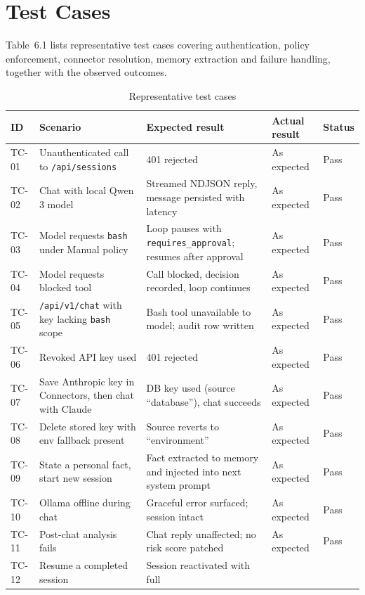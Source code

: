 \documentclass[12pt,a4paper,oneside]{report}
\begin{document}
\section{Test Cases}
Table~6.1 lists representative test cases covering authentication,
policy enforcement, connector resolution, memory extraction and
failure handling, together with the observed outcomes.
\begin{table}[!t]
\caption{Representative test cases}
\centering
\begin{singlespace}
\footnotesize
\setlength{\tabcolsep}{4pt}
\begin{tabular}{p{1.1cm}p{4.1cm}p{4.0cm}p{2.5cm}p{1.2cm}}
\toprule
\textbf{ID} & \textbf{Scenario} & \textbf{Expected result} &
\textbf{Actual result} & \textbf{Status} \\
\midrule
TC-01 & Unauthenticated call to \texttt{/api/sessions} & 401 rejected
& As expected & Pass \\
TC-02 & Chat with local Qwen 3 model & Streamed NDJSON reply, message
persisted with latency & As expected & Pass \\
TC-03 & Model requests \texttt{bash} under Manual policy & Loop pauses
with \texttt{requires\_approval}; resumes after approval & As expected
& Pass \\
TC-04 & Model requests blocked tool & Call blocked, decision recorded,
loop continues & As expected & Pass \\
TC-05 & \texttt{/api/v1/chat} with key lacking \texttt{bash} scope &
Bash tool unavailable to model; audit row written & As expected &
Pass \\
TC-06 & Revoked API key used & 401 rejected & As expected & Pass \\
TC-07 & Save Anthropic key in Connectors, then chat with Claude &
DB key used (source ``database''), chat succeeds & As expected &
Pass \\
TC-08 & Delete stored key with env fallback present & Source reverts
to ``environment'' & As expected & Pass \\
TC-09 & State a personal fact, start new session & Fact extracted to
memory and injected into next system prompt & As expected & Pass \\
TC-10 & Ollama offline during chat & Graceful error surfaced;
session intact & As expected & Pass \\
TC-11 & Post-chat analysis fails & Chat reply unaffected; no risk
score patched & As expected & Pass \\
TC-12 & Resume a completed session & Session reactivated with full

\end{tabular}
\end{singlespace}
\end{table}
\end{document}
